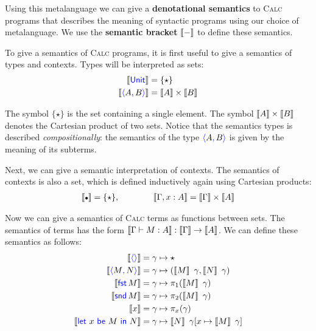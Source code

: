 Using this metalanguage we can give a \textbf{denotational semantics} to
\textsc{Calc} programs that describes the meaning of syntactic programs using 
our choice of metalanguage.
We use the \textbf{semantic bracket} $\left\llbracket - \right\rrbracket$ to define these semantics.

To give a semantics of \textsc{Calc} programs, it is first useful to give a
semantics of types and contexts.  Types will be interpreted as sets:
\begin{align} \label{eqn:calc-types-in-finset}
  \dbracket{\plUnit} &= \{\star\} \\
  \dbracket{\plpair{A}{B}} &= \dbracket{A} \times \dbracket{B}
\end{align}

The symbol $\{\star\}$ is the set containing a single element. The symbol
$\left\llbracket A \right\rrbracket \times \left\llbracket B \right\rrbracket$ denotes the Cartesian product of two sets.
Notice that the semantics types is described \emph{compositionally}: the 
semantics of the type $\plpair{A}{B}$ is given by the meaning of its subterms.

Next, we can give a semantic interpretation of contexts. The semantics of 
contexts is also a set, which is defined inductively 
again using Cartesian products:
\begin{align*}
  \dbracket{\ctxemp} = \{\star\},
  \qquad\qquad
  \dbracket{\Gamma, x : A} =  \dbracket{\Gamma} \times \dbracket{A}
\end{align*}

Now we can give a semantics of \textsc{Calc} terms as functions between sets. 
The semantics of terms has the form $\left\llbracket \Gamma \vdash M : A \right\rrbracket
: \left\llbracket \Gamma \right\rrbracket \to \left\llbracket A \right\rrbracket$.
We can define these semantics as follows:
\begin{align*}
  \dbracket{\plunit{}} &= \gamma \mapsto \star\\
  \dbracket{\plpair{M}{N}} &= \gamma \mapsto (\dbracket{M}~\gamma, \dbracket{N}~\gamma) \\
  \dbracket{\plfst{M}} &= \gamma \mapsto \pi_1 (\dbracket{M}~\gamma) \\
  \dbracket{\plsnd{M}} &= \gamma \mapsto \pi_2 (\dbracket{M}~\gamma) \\
  \dbracket{x} &= \gamma \mapsto \pi_x (\gamma) \\
  \dbracket{\pllet{x}{M}{N}} &= \gamma \mapsto \dbracket{N}~\gamma[x \mapsto \dbracket{M}~\gamma]
\end{align*}

